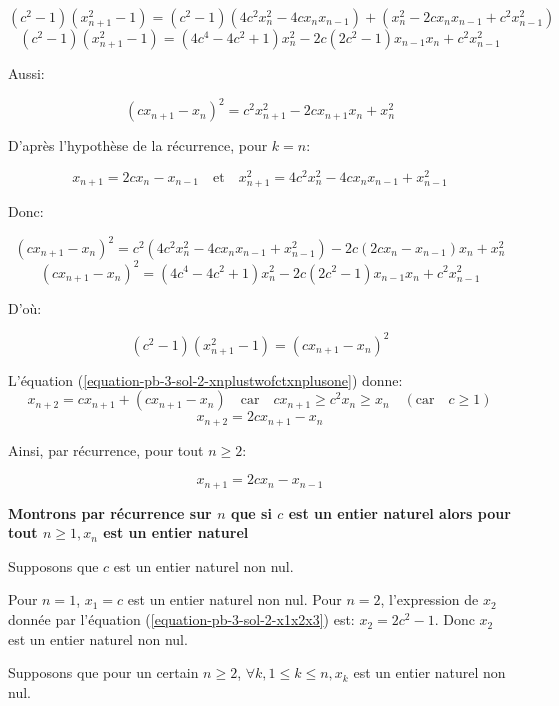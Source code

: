 \documentclass[12pt,a4paper,article]{memoir}
\begin{document}
\[(c^2 - 1)(x_{n+1}^2 - 1) = (c^{2} - 1)(4c^{2}x_{n}^{2} - 4cx_{n}x_{n-1}) + (x_{n}^{2} - 2c x_{n}x_{n-1} + c^{2}x_{n-1}^{2}) \]
\[(c^2 - 1)(x_{n+1}^2 - 1) = (4c^{4} - 4c^{2} + 1)x_{n}^{2} - 2c(2c^{2} - 1)x_{n-1}x_{n} + c^{2}x_{n-1}^{2} \]

Aussi:

\[(cx_{n+1} - x_{n})^{2} = c^{2}x_{n+1}^{2} - 2cx_{n+1}x_{n} + x_{n}^{2} \]

D'après l'hypothèse de la récurrence, pour $k=n$:

\[x_{n+1} = 2cx_{n} - x_{n-1} \quad \textrm{et} \quad x_{n+1}^2 = 4c^{2}x_{n}^{2} - 4cx_{n}x_{n-1} + x_{n-1}^{2} \]

Donc:

\[(cx_{n+1} - x_{n})^{2} = c^{2}(4c^{2}x_{n}^{2} - 4cx_{n}x_{n-1} + x_{n-1}^{2}) - 2c(2cx_{n} - x_{n-1})x_{n} + x_{n}^{2} \]
\[(cx_{n+1} - x_{n})^{2} = (4c^{4} - 4c^{2} + 1)x_{n}^{2} - 2c(2c^{2} - 1)x_{n-1}x_{n} + c^{2}x_{n-1}^{2} \]

D'où:

\[(c^2 - 1)(x_{n+1}^2 - 1) = (cx_{n+1} - x_{n})^{2}\]

L'équation (\ref{equation-pb-3-sol-2-xnplustwofctxnplusone}) donne:
\[x_{n+2} = cx_{n+1} + (cx_{n+1} - x_{n}) \quad \textrm{car} \quad cx_{n+1} \geq c^{2}x_{n} \geq x_{n} \quad (\textrm{car} \quad c \geq 1)\]
\[x_{n+2} = 2cx_{n+1} - x_{n}\]

Ainsi, par récurrence, pour tout $n \geq 2$: 

\begin{equation}
x_{n+1} = 2cx_{n} - x_{n-1}
\label{equation-pb-3-sol-2-xnplusonefct-xn-xnminusone}
\end{equation}

\bigskip

\textbf{Montrons par récurrence sur $n$ que si $c$ est un entier naturel alors pour tout $n \geq 1, x_{n}$ est un entier naturel}

\bigskip

Supposons que $c$ est un entier naturel non nul.

\bigskip

Pour $n = 1$, $x_{1} = c$ est un entier naturel non nul. Pour $n=2$, l'expression de $x_{2}$ donnée par l'équation (\ref{equation-pb-3-sol-2-x1x2x3}) est: $x_{2}=2c^{2} - 1$. Donc $x_{2}$ est un entier naturel non nul.

Supposons que pour un certain $n \geq 2$, $\forall k, 1 \leq k \leq n, x_{k}$ est un entier naturel non nul. 

\bigskip
\end{document}
